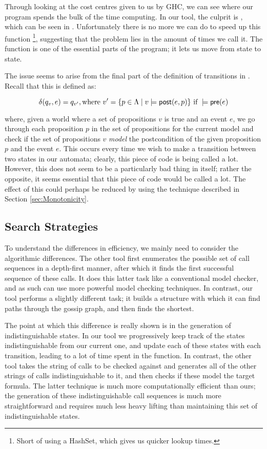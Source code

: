 \documentclass[ %
                    author={Leo Poulson},
                supervisor={Dr. Steven Ramsay},
                    degree={BSc},
                     title={Epistemic Planning for the Dynamic Gossip problem},
                  subtitle={},
                      year={2019} ]{dissertation}
\begin{document}
Through looking at the cost centres given to us by GHC, we can see where our
program spends the bulk of the time computing. In our tool, the culprit is
, which can be seen in . Unfortunately
there is no more we can do to speed up this function \footnote{Short of using a
  HashSet, which gives us quicker lookup times.}, suggesting that the problem
lies in the amount of times we call it. The function is one of the essential
parts of the program; it lets us move from state to state.

The issue seems to arise from the final part of the definition of transitions in
\mestar. Recall that this is defined as:

\begin{equation} \label{eq:delta1}
  \delta(q_v, e) = q_{v'}, \text{where } v' = \{p \in \Lambda \mid v \models \textsf{post}(e, p)\}
  \text{ if } 
  \models \textsf{pre}(e)
\end{equation}

\noindent where, given a world where a set of propositions $v$ is true and an
event $e$, we go through each proposition $p$ in the set of propositions for the
current model and check if the set of propositions $v$ \emph{model} the postcondition
of the given proposition $p$ and the event $e$. This occurs every time we wish
to make a transition between two states in our automata; clearly, this piece of
code is being called a lot. However, this does not seem to be a particularly bad
thing in itself; rather the opposite, it seems essential that this piece of code
would be called a lot. The effect of this could perhaps be reduced by using the
technique described in Section \ref{sec:Monotonicity}.

\subsection{Search Strategies}

To understand the differences in efficiency, we mainly need to consider the
algorithmic differences. The other tool first enumerates the possible set of
call sequences in a depth-first manner, after which it finds the first
successful sequence of these calls. It does this latter task like a conventional
model checker, and as such can use more powerful model checking techniques. In
contrast, our tool performs a slightly different task; it builds a structure
with which it can find paths through the gossip graph, and then finds the
shortest.

The point at which this difference is really shown is in the generation of
indistinguishable states. In our tool we progressively keep track of the states
indistinguishable from our current one, and update each of these states with
each transition, leading to a lot of time spent in the  function.
In contrast, the other tool takes the string of calls to be checked against and
generates all of the other strings of calls indistinguishable to it, and then
checks if these model the target formula. The latter technique is much more
computationally efficient than ours; the generation of these indistinguishable
call sequences is much more straightforward and requires much less heavy lifting
than maintaining this set of indistinguishable states.
\end{document}
